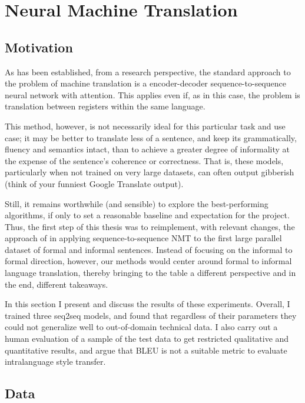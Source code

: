 \chapter{Neural Machine Translation}

\label{Chapter03}

\section{Motivation}

As has been established, from a research perspective, the standard approach to the problem of machine translation is a encoder-decoder sequence-to-sequence neural network with attention. This applies even if, as in this case, the problem is translation between registers within the same language.

This method, however, is not necessarily ideal for this particular task and use case; it may be better to translate less of a sentence, and keep its grammatically, fluency and semantics intact, than to achieve a greater degree of informality at the expense of the sentence's coherence or correctness. That is, these models, particularly when not trained on very large datasets, can often output gibberish (think of your funniest Google Translate output).

Still, it remains worthwhile (and sensible) to explore the best-performing algorithms, if only to set a reasonable baseline and expectation for the project. Thus, the first step of this thesis was to reimplement, with relevant changes, the approach of \cite{rao2018gyafc} in applying sequence-to-sequence NMT to the first large parallel dataset of formal and informal sentences. Instead of focusing on the informal to formal direction, however, our methods would center around formal to informal language translation, thereby bringing to the table a different perspective and in the end, different takeaways.

In this section I present and discuss the results of these experiments. Overall, I trained three seq2seq models, and found that regardless of their parameters they could not generalize well to out-of-domain technical data. I also carry out a human evaluation of a sample of the test data to get restricted qualitative and quantitative results, and argue that BLEU is not a suitable metric to evaluate intralanguage style transfer.

\section{Data}

